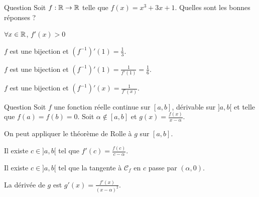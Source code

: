 \begin{multi}[multiple,feedback=
{On a \(f'(x)=3x^2+3>0\) pour tout \(x\in \Rr\). Ainsi \(f\) est continue et est strictement croissante sur \(\Rr\). Donc, d'après le théorème de la bijection, \(f\) est une bijection et
\[\forall x\in \Rr,\; (f^{-1})'(x)=\frac{1}{f'\left(f^{-1}(x)\right)}.\]
En particulier, et puisque \(f(0)=1\), \(\displaystyle (f^{-1})'(1)=\frac{1}{f'(f^{-1}(1))}=\frac{1}{f'(0)}=\frac{1}{3}\).
}]{Question}
Soit \(\displaystyle f:\mathbb{R}\to \mathbb{R}\) telle que \(f(x)=x^3+3x+1\). Quelles sont les bonnes réponses ?

    \item* \(\forall x\in \mathbb{R}\), \(f'(x)>0\)
    \item* \(f\) est une bijection et \(\displaystyle (f^{-1})'(1)=\frac{1}{3}\).
    \item \(f\) est une bijection et \(\displaystyle (f^{-1})'(1)=\frac{1}{f'(1)}=\frac{1}{6}\).
    \item \(f\) est une bijection et \(\displaystyle (f^{-1})'(x)=\frac{1}{f'(x)}\).
\end{multi}


\begin{multi}{Question}
Soit \(f\) une fonction réelle continue sur \([a,b]\), dérivable sur \(]a,b[\) et telle que \(f(a)=f(b)=0\). Soit \(\alpha \notin [a,b]\) et \(\displaystyle g(x)=\frac{f(x)}{x-\alpha }\).

    \item* On peut appliquer le théorème de Rolle à \(g\) sur \([a,b]\).
    \item* Il existe \(c\in ]a,b[\) tel que \(\displaystyle f'(c)=\frac{f(c)}{c-\alpha}\).
    \item* Il existe \(c\in ]a,b[\) tel que la tangente à \(\mathcal{C}_f\) en \(c\) passe par \((\alpha ,0)\).
    \item La dérivée de \(g\) est \(\displaystyle g'(x)=\frac{f'(x)}{(x-\alpha )^2}\).
\end{multi}


